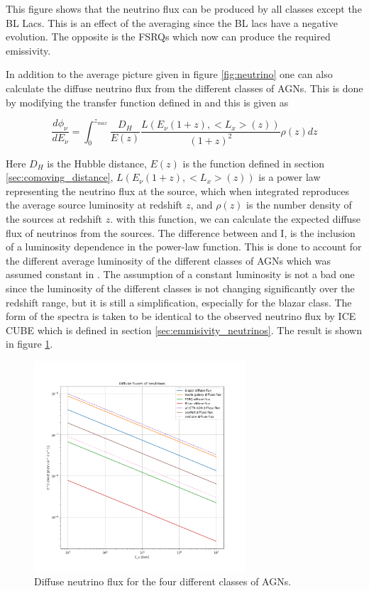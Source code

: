 \documentclass{article}
\begin{document}
This figure shows that the neutrino flux can be produced by all classes except 
the BL Lacs. This is an effect of the averaging since the BL lacs have a negative evolution.
The opposite is the FSRQs which now can produce the required emissivity.

In addition to the average picture given in figure \ref*{fig:neutrino} one can also calculate the diffuse neutrino flux from the different classes of AGNs. This is done by modifying the transfer function defined in \cite{Palladino_2020} and this is given as


\begin{equation}
    \frac{d\phi_\nu}{dE_\nu} = \int_0^{z_{max}} \frac{D_H}{E(z)} \frac{L(E_\nu (1+z),<L_x>(z))}{(1+z)^2} \rho(z) dz
\end{equation}

Here $D_H$ is the Hubble distance, $E(z)$ is the function defined in section \ref{sec:comoving_distance}, $L(E_\nu (1+z), <L_x>(z))$ is a power law representing the neutrino flux at the source, which when integrated reproduces the average source luminosity at redshift $z$, and $\rho(z)$ is the number density of the sources at redshift $z$.
with this function, we can calculate the expected diffuse flux of neutrinos from the sources. The difference between \cite{Palladino_2020} and I, is the inclusion of a luminosity dependence in the power-law function. This is done to account for the different average luminosity of the different classes of AGNs which was assumed constant in \cite{Palladino_2020}. 
The assumption of a constant luminosity is not a bad one since the luminosity of the different classes is not changing significantly over the redshift range, but it is still a simplification, especially for the blazar class. The form of the spectra is taken to be identical to the observed neutrino flux by ICE CUBE which is defined in section \ref*{sec:emmisivity_neutrinos}.
The result is shown in figure \ref{fig:neutrino_diffuse}.
\begin{figure}[H]
    \centering
    \includegraphics[width = 0.7\textwidth]{new_plots/diffuse_fluxes_neutrino_no_cutoff.png}
    \caption{Diffuse neutrino flux for the four different classes of AGNs.}
    \label{fig:neutrino_diffuse}
\end{figure}
\end{document}
